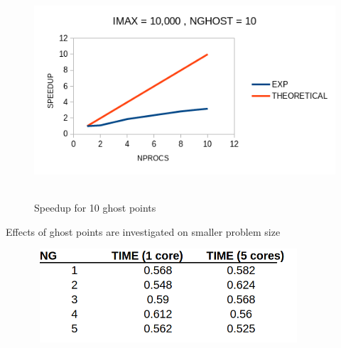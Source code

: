 \documentclass[12pt]{article}
\begin{document}
    \begin{figure}[hbt!]
        \begin{center}
        \hspace*{2.5cm}\includegraphics[height = 80mm,width = 140mm]{plot_10g_speed.png}   
        \caption{Speedup for 10 ghost points}                       
        \end{center}  
    \end{figure}    


    \newpage
    \noindent
    Effects of ghost points are investigated on smaller problem size

    \begin{figure}[H]
        \begin{center}
        \includegraphics[height = 35mm,width = 100mm]{ghostInvest.png}              
        \end{center}  
    \end{figure}       
\end{document}

